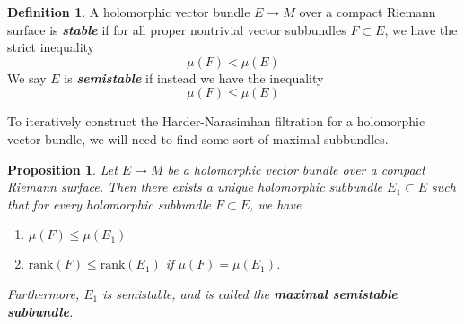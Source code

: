 \documentclass[psamsfonts, 12pt]{amsart}
\newtheorem{prop}[thm]{Proposition}
\theoremstyle{definition}
\newtheorem{defn}[thm]{Definition}
\theoremstyle{remark}
\newcommand{\ib}[1]{\textbf{\textit{#1}}}
\begin{document}
%
\begin{defn}
A holomorphic vector bundle $E \to M$ over a compact Riemann surface is \ib{stable}
if for all proper nontrivial vector subbundles $F \subset E$, we have the
strict inequality
\[
\mu(F) < \mu(E)
\]
We say $E$ is \ib{semistable} if instead we have the inequality
\[
\mu(F) \leq \mu(E)
\]
\end{defn}
%
To iteratively construct the Harder-Narasimhan filtration for a holomorphic
vector bundle, we will need to find some sort of maximal subbundles.
%
\begin{prop}
Let $E \to M$ be a holomorphic vector bundle over a compact Riemann surface.
Then there exists a unique holomorphic subbundle $E_1 \subset E$ such that
for every holomorphic subbundle $F \subset E$, we have
\begin{enumerate}
  \item $\mu(F) \leq \mu(E_1)$
  \item $\mathrm{rank}(F) \leq \mathrm{rank}(E_1)$ if $\mu(F) = \mu(E_1)$.
\end{enumerate}
Furthermore, $E_1$ is semistable, and is called the \ib{maximal semistable subbundle}.
\end{prop}
%
\end{document}

